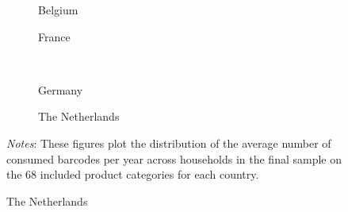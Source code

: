 \begin{figure}[H]
    \centering
    \caption{Barcodes per year}
    \label{fig: app_data_households_bar_year}
    \begin{subfigure}[t]{.49\textwidth}
         \centering
         \caption{Belgium}
         \scalebox{0.45}{}
     \end{subfigure}
     \begin{subfigure}[t]{.49\textwidth}
         \centering
         \caption{France}
         \scalebox{0.45}{}
     \end{subfigure}\\
     \begin{subfigure}[t]{.49\textwidth}
         \centering
         \caption{Germany}
         \scalebox{0.45}{}
     \end{subfigure}
     \begin{subfigure}[t]{.49\textwidth}
         \centering
         \caption{The Netherlands}
         \scalebox{0.45}{}
     \end{subfigure}
     \parbox{\textwidth}{
        \begin{spacing}{1} 
            {\footnotesize 
            \textit{Notes}: These figures plot the distribution of the average number of consumed barcodes per year across households in the final sample on the 68 included product categories for each country.}
        \end{spacing}}
 \end{figure} 

